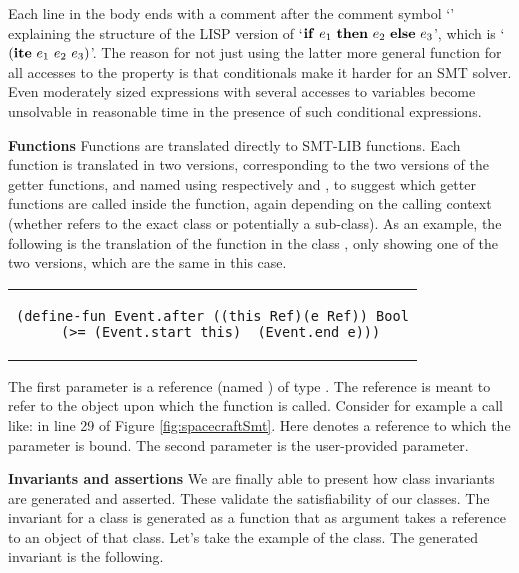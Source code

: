 Each line in the body ends with a comment after the comment symbol
`\code{;}' explaining the structure of the LISP version of `${\bf
  if}\ e_1\ {\bf then}\ e_2\ {\bf else}\ e_3$', which is `$({\bf
  ite}\ e_1\ e_2\ e_3)$'. The reason for not just using the latter
more general function  for all accesses to the
 property is that conditionals make it harder for an SMT
solver. Even moderately sized expressions with several accesses to
variables become unsolvable in reasonable time in the presence of such
conditional expressions. 

\textbf{Functions} Functions are translated directly to SMT-LIB
functions.  Each function is translated in two versions, corresponding
to the two versions of the getter functions, and named using
respectively  and
, to suggest which getter functions are
called inside the function, again depending on the calling context
(whether  refers to the exact class or potentially a
sub-class). As an example, the following is the translation of the
 function in the class , only showing one of
the two versions, which are the same in this case.

\begin{center}
\begin{tabular}{c}
\begin{lstlisting}
(define-fun Event.after ((this Ref)(e Ref)) Bool
  (>= (Event.start this)  (Event.end e)))
\end{lstlisting}
\end{tabular}
\end{center}

The first parameter is a reference (named ) of type
. The  reference is meant to refer to the object
upon which the function is called. Consider for example a call like:
 in line 29 of Figure
\ref{fig:spacecraftSmt}. Here  denotes a reference
to which the parameter  is bound.  The second parameter is
the user-provided parameter.


\textbf{Invariants and assertions} We are finally able to present how
class invariants are generated and asserted. These validate the
satisfiability of our classes.  The invariant for a class is generated
as a function that as argument takes a  reference to an
object of that class. Let's take the example of the
 class. The generated invariant is the following.


